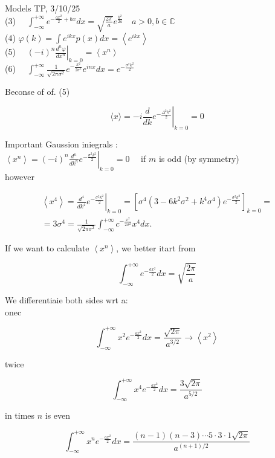\documentclass[10pt]{article}
\begin{document}
Models TP, 3/10/25\\
(3) $\quad \int_{-\infty}^{+\infty} e^{-\frac{a x^{2}}{2}+b x} d x=\sqrt{\frac{2 \pi}{a}} e^{\frac{b^{2}}{2 a}} \quad a>0, b \in \mathbb{C}$\\
(4) $\varphi(k)=\int e^{i k x} p(x) d x=\left\langle e^{i k x}\right\rangle$\\
(5) $\left.\quad(-i)^{n} \frac{d^{n} \varphi}{d x^{n}}\right|_{k=0}=\left\langle x^{n}\right\rangle$\\
(6) $\quad \int_{-\infty}^{+\infty} \frac{1}{\sqrt{2 \pi \sigma^{2}}} e^{-\frac{x^{2}}{2 \sigma^{2}}} e^{i n x} d x=e^{-\frac{\sigma^{2} k^{2}}{2}}$

Beconse of of. (5)

$$
\langle x\rangle=-\left.i \frac{d}{d k} e^{-\frac{\Delta^{2} k^{2}}{2}}\right|_{k=0}=0
$$

Important Gaussion iniegrals :\\
$\left\langle x^{n}\right\rangle=\left.(-i)^{n} \frac{d^{n}}{d k^{n}} e^{-\frac{\sigma^{2} k^{2}}{2}}\right|_{k=0}=0 \quad$ if $m$ is odd (by symmetry)\\
however

$$
\begin{gathered}
\left\langle x^{4}\right\rangle=\left.\frac{d^{4}}{d k^{4}} e^{-\frac{\sigma^{2} k^{2}}{2}}\right|_{k=0}=\left[\sigma^{4}\left(3-6 k^{2} \sigma^{2}+k^{4} \sigma^{4}\right) e^{-\frac{\sigma^{2} k^{2}}{2}}\right]_{k=0}= \\
=3 \sigma^{4}=\frac{1}{\sqrt{2 \pi \sigma^{2}}} \int_{-\infty}^{+\infty} c^{-\frac{x^{2}}{2 \sigma^{2}}} x^{4} d x .
\end{gathered}
$$

If we want to calculate $\left\langle x^{n}\right\rangle$, we better itart from

$$
\int_{-\infty}^{+\infty} e^{-\frac{a x^{2}}{2}} d x=\sqrt{\frac{2 \pi}{a}}
$$

We differentiaie both sides wrt a:\\
onec

$$
\int_{-\infty}^{+\infty} x^{2} e^{-\frac{a x^{2}}{2}} d x=\frac{\sqrt{2 \pi}}{a^{3 / 2}} \rightarrow\left\langle x^{2}\right\rangle
$$

twice

$$
\int_{-\infty}^{+\infty} x^{4} e^{-\frac{a x^{2}}{2}} d x=\frac{3 \sqrt{2 \pi}}{a^{5 / 2}}
$$

in times $n$ is even

$$
\int_{-\infty}^{+\infty} x^{n} e^{-\frac{a x^{2}}{2}} d x=\frac{(n-1)(n-3) \cdots 5 \cdot 3 \cdot 1 \sqrt{2 \pi}}{a^{(n+1) / 2}}
$$
\end{document}
